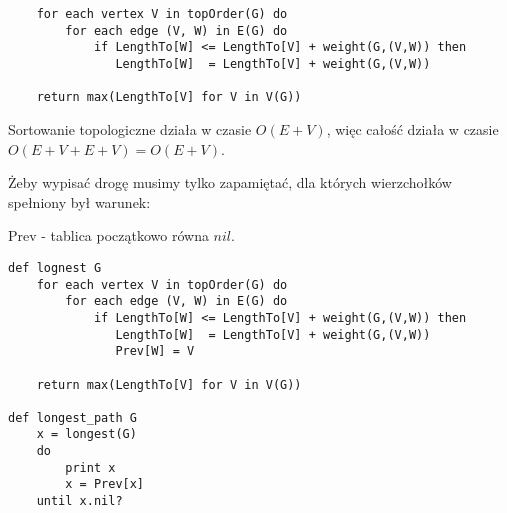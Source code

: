 \documentclass[svgnames]{report}
\begin{document}
\begin{lstlisting}
    for each vertex V in topOrder(G) do
        for each edge (V, W) in E(G) do
            if LengthTo[W] <= LengthTo[V] + weight(G,(V,W)) then
               LengthTo[W]  = LengthTo[V] + weight(G,(V,W))
 
    return max(LengthTo[V] for V in V(G))
\end{lstlisting}

Sortowanie topologiczne działa w czasie $O(E+V)$,
więc całość działa w czasie $O(E+V+E+V) = O(E+V)$.

Żeby wypisać drogę musimy tylko zapamiętać, dla których wierzchołków spełniony był warunek:

Prev - tablica początkowo równa $nil$.\\

\begin{lstlisting}
def lognest G
    for each vertex V in topOrder(G) do
        for each edge (V, W) in E(G) do
            if LengthTo[W] <= LengthTo[V] + weight(G,(V,W)) then
               LengthTo[W]  = LengthTo[V] + weight(G,(V,W))
               Prev[W] = V
 
    return max(LengthTo[V] for V in V(G))
    
def longest_path G
	x = longest(G)
	do
		print x
		x = Prev[x]
	until x.nil?
\end{lstlisting}



\section{}%
\end{document}
